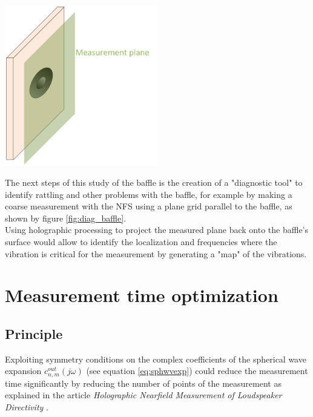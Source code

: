 \documentclass{report}
\begin{document}
\begin{minipage}{0.4\textwidth}
\begin{center}
	\includegraphics[width=0.5\textwidth]{GridOpti/meas_rattling} 
    \captionsetup{hypcap=false} 
	\label{fig:diag_baffle}
\end{center}
\end{minipage}
\begin{minipage}{0.6\textwidth}
The next steps of this study of the baffle is the creation of a "diagnostic tool" to identify rattling and other problems with the baffle, for example by making a coarse measurement with the NFS using a plane grid parallel to the baffle, as shown by figure \ref{fig:diag_baffle}.\\
Using holographic processing to project the measured plane back onto the baffle's surface would allow to identify the localization and frequencies where the vibration is critical for the measurement by generating a "map" of the vibrations.
\end{minipage}



\chapter{Measurement time optimization}

\section{Principle}


Exploiting symmetry conditions on the complex coefficients of the spherical wave expansion $c_{n,m}^{out}(j \omega)$ (see equation \ref{eq:sphwvexp}) could reduce the measurement time significantly by reducing the number of points of the measurement as explained in the article \textit{Holographic Nearfield Measurement of Loudspeaker Directivity} \citep[][sect.~4]{aeshs}. \\
\end{document}
